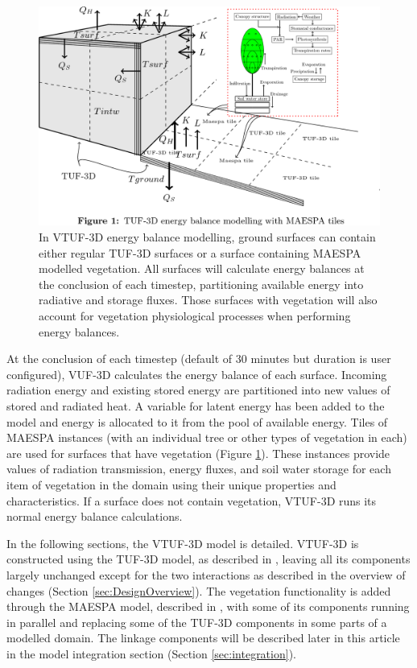 \documentclass[final,3p,times,authoryear]{elsarticle}
\begin{document}
\begin{figure}[!htbp]
 \includegraphics[trim = 0mm 14mm 22mm 0.0mm, clip, scale=0.25]{images/TUFWithMaespaInsert.png}
 \caption{\label{fig:TUFWithMaespaInsert} In VTUF-3D energy balance modelling, ground surfaces can contain either regular TUF-3D surfaces or a surface containing MAESPA modelled vegetation. All surfaces will calculate energy balances at the conclusion of each timestep, partitioning available energy into radiative and storage fluxes. Those surfaces with vegetation will also account for vegetation physiological processes when performing energy balances.}
\end{figure}

At the conclusion of each timestep (default of 30 minutes but duration is user configured), VUF-3D calculates the energy balance of each surface. Incoming radiation energy and existing stored energy are partitioned into new values of stored and radiated heat. A variable for latent energy has been added to the model and energy is allocated to it from the pool of available energy. Tiles of MAESPA instances (with an individual tree or other types of vegetation in each) are used for surfaces that have vegetation (Figure \ref{fig:TUFWithMaespaInsert}). These instances provide values of radiation transmission, energy fluxes, and soil water storage for each item of vegetation in the domain using their unique properties and characteristics. If a surface does not contain vegetation, VTUF-3D runs its normal energy balance calculations.

In the following sections, the VTUF-3D model is detailed. VTUF-3D is constructed using the TUF-3D model, as described in \cite{Krayenhoff2007}, leaving all its components largely unchanged except for the two interactions as described in the overview of changes (Section \ref{sec:DesignOverview}). The vegetation functionality is added through the MAESPA model, described in \cite{Duursma2012}, with some of its components running in parallel and replacing some of the TUF-3D components in some parts of a modelled domain. The linkage components will be described later in this article in the model integration section (Section \ref{sec:integration}).
\end{document}
